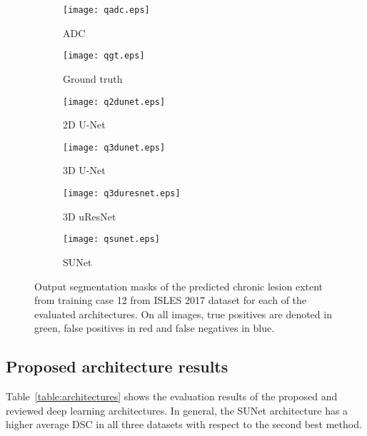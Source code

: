 \documentclass[letterpaper,final,authoryear,3p,times,twocolumn]{elsarticle}
\begin{document}
\def\qsubfig{0.162\textwidth}
\begin{figure*}
	\centering
	\begin{subfigure}[b]{\qsubfig}
		\texttt{[image: qadc.eps]}
		\caption{ADC}
	\end{subfigure}
	\begin{subfigure}[b]{\qsubfig}
		\texttt{[image: qgt.eps]}
		\caption{Ground truth}
	\end{subfigure}
	\begin{subfigure}[b]{\qsubfig}
		\texttt{[image: q2dunet.eps]}
		\caption{2D U-Net}
	\end{subfigure} 
	\begin{subfigure}[b]{\qsubfig}
		\texttt{[image: q3dunet.eps]}
		\caption{3D U-Net}
	\end{subfigure}
	\begin{subfigure}[b]{\qsubfig}
		\texttt{[image: q3duresnet.eps]}
		\caption{3D uResNet}
	\end{subfigure}
	\begin{subfigure}[b]{\qsubfig}
		\texttt{[image: qsunet.eps]}
		\caption{SUNet}
	\end{subfigure}
	\caption{Output segmentation masks of the predicted chronic lesion extent from training case 12 from ISLES 2017 dataset for each of the evaluated architectures. On all images, true positives are denoted in green, false positives in red and false negatives in blue.}
	\label{fig:qisles2017}
\end{figure*}

\subsection{Proposed architecture results} %

Table~\ref{table:architectures} shows the evaluation results of the proposed and reviewed deep learning architectures. In general, the SUNet architecture has a higher average DSC in all three datasets with respect to the second best method.
\end{document}
